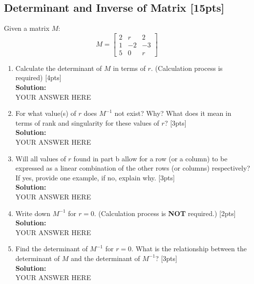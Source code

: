 \documentclass{article}
\begin{document}
\subsection{Determinant and Inverse of Matrix [15pts]}
Given a matrix $M$:
$$M = \begin{bmatrix} 
  2 & r & 2 \\ 
  1 & -2 & -3 \\
  5 & 0 & r
  \end{bmatrix}$$
\begin{enumerate}[label=(\alph*)]
\item Calculate the determinant of $M$ in terms of $r$. (Calculation process is required) [4pts]\bigskip \\
\textbf{Solution:}\\
YOUR ANSWER HERE
\newpage
\item For what value(s) of $r$ does $M^{-1}$ not exist? Why? What does it mean in terms of rank and singularity for these values of $r$? [3pts] \bigskip \\
\textbf{Solution:}\\
YOUR ANSWER HERE
\newpage
\item Will all values of $r$ found in part b allow for a row (or a column) to be expressed as a linear combination of the other rows (or columns) respectively? If yes, provide one example, if no, explain why. [3pts]\bigskip \\
\textbf{Solution:}\\
YOUR ANSWER HERE
\newpage
\item Write down $M^{-1}$ for $r = 0$. (Calculation process is \textbf{NOT} required.) [2pts]\bigskip \\
\textbf{Solution:}\\
YOUR ANSWER HERE
\newpage
\item Find the determinant of $M^{-1}$ for $r = 0$. What is the relationship between the determinant of $M$ and the determinant of $M^{-1}$? [3pts]\bigskip \\
\textbf{Solution:}\\
YOUR ANSWER HERE
\newpage
\end{enumerate}
\end{document}
